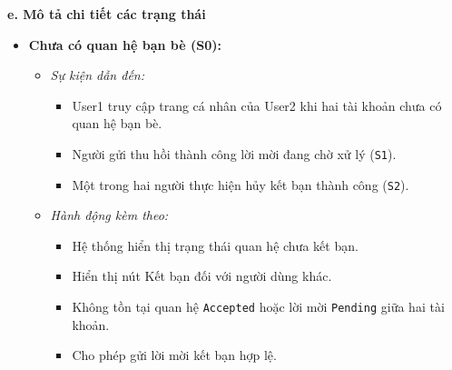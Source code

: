 \documentclass[11pt,a4paper]{article}
\begin{document}
\noindent\textbf{e. Mô tả chi tiết các trạng thái}
\begin{itemize}[leftmargin=1.2cm, noitemsep]
    \item[\textbf{--}] \textbf{Chưa có quan hệ bạn bè (S0):}
    \begin{itemize}[leftmargin=0.8cm, label=--, noitemsep]
        \item \textit{Sự kiện dẫn đến:}
        \begin{itemize}[leftmargin=0.6cm, label=$\ast$, noitemsep]
            \item User1 truy cập trang cá nhân của User2 khi hai tài khoản chưa có quan hệ bạn bè.
            \item Người gửi thu hồi thành công lời mời đang chờ xử lý (\texttt{S1}).
            \item Một trong hai người thực hiện hủy kết bạn thành công (\texttt{S2}).
        \end{itemize}
        \item \textit{Hành động kèm theo:}
        \begin{itemize}[leftmargin=0.6cm, label=$\ast$, noitemsep]
            \item Hệ thống hiển thị trạng thái quan hệ chưa kết bạn.
            \item Hiển thị nút Kết bạn đối với người dùng khác.
            \item Không tồn tại quan hệ \texttt{Accepted} hoặc lời mời \texttt{Pending} giữa hai tài khoản.
            \item Cho phép gửi lời mời kết bạn hợp lệ.
        \end{itemize}
    \end{itemize}


\end{itemize}
\end{document}
